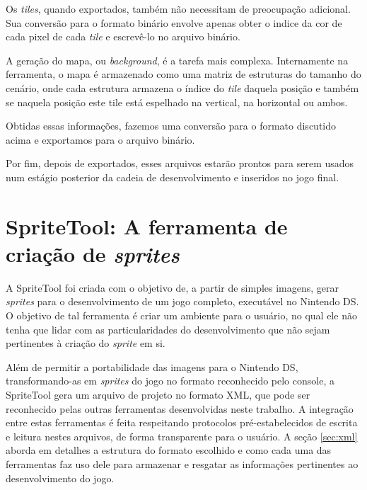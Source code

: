 \documentclass[brazil]{abnt}
\begin{document}
Os \textit{tiles}, quando exportados, também não necessitam de preocupação adicional. Sua conversão para o formato binário envolve apenas obter o indice da cor de cada pixel de cada \textit{tile} e escrevê-lo no arquivo binário.

A geração do mapa, ou \textit{background}, é a tarefa mais complexa. Internamente na ferramenta, o mapa é armazenado como uma matriz de estruturas do tamanho do cenário, onde cada estrutura armazena o índice do \textit{tile} daquela posição e também se naquela posição este tile está espelhado na vertical, na horizontal ou ambos. 

Obtidas essas informações, fazemos uma conversão para o formato discutido acima e exportamos para o arquivo binário.



Por fim, depois de exportados, esses arquivos estarão prontos para serem usados num estágio posterior da cadeia de desenvolvimento e inseridos no jogo final.

\section{SpriteTool: A ferramenta de criação de \textit{sprites}}

A SpriteTool foi criada com o objetivo de, a partir de simples imagens, gerar \textit{sprites} para o desenvolvimento de um jogo completo, executável no Nintendo DS. O objetivo de tal ferramenta é criar um ambiente para o usuário, no qual ele não tenha que lidar com as particularidades do desenvolvimento que não sejam pertinentes à criação do \textit{sprite} em si.

Além de permitir a portabilidade das imagens para o Nintendo DS, transformando-as em \textit{sprites} do jogo no formato reconhecido pelo console, a SpriteTool gera um arquivo de projeto no formato XML, que pode ser reconhecido pelas outras ferramentas desenvolvidas neste trabalho. A integração entre estas ferramentas é feita respeitando protocolos pré-estabelecidos de escrita e leitura nestes arquivos, de forma transparente para o usuário. A seção \ref{sec:xml} aborda em detalhes a estrutura do formato escolhido e como cada uma das ferramentas faz uso dele para armazenar e resgatar as informações pertinentes ao desenvolvimento do jogo.
\end{document}
